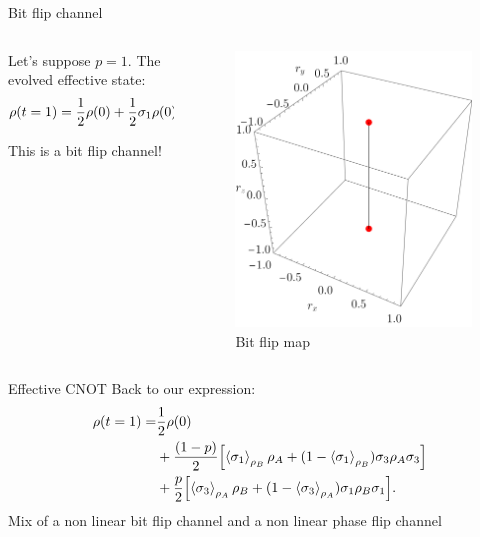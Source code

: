 \begin{frame}{Bit flip channel}
    \begin{columns}
        \begin{column}{0.5\textwidth}
            Let's suppose $p=1$. The evolved effective state:
            \begin{equation*}
              \rho(t=1)=\frac{1}{2}\rho(0)+\frac{1}{2}\sigma_{1}\rho(0)\sigma_{1}.
            \end{equation*}
        
            This is a bit flip channel!
        \end{column}
        \begin{column}{0.5\textwidth}
            \begin{figure}[h!]
                \centering
                \includegraphics[width=0.7\linewidth]{figures/maxent_results/CNOT_p=1._t=1_r=0.9.png}
                \caption{Bit flip map}
                \label{fig:SWAPFactor2D}
              \end{figure}
        \end{column}
    \end{columns}
\end{frame}
\begin{frame}{Effective CNOT}
    Back to our expression:
    \begin{align*}
        \rho(t=1)=&\frac{1}{2}\rho(0)\\
        &+\frac{(1-p)}{2}\qty[\expval{\sigma_{1}}_{\rho_{B}}\rho_{A}+(1-\expval{\sigma_{1}}_{\rho_{B}})\sigma_{3}\rho_{A}\sigma_{3}]\\
        &+\frac{p}{2}\qty[\expval{\sigma_{3}}_{\rho_{A}}\rho_{B}+(1-\expval{\sigma_{3}}_{\rho_{A}})\sigma_{1}\rho_{B}\sigma_{1}].
    \end{align*}
    Mix of a non linear bit flip channel and a non linear phase flip channel
\end{frame}
